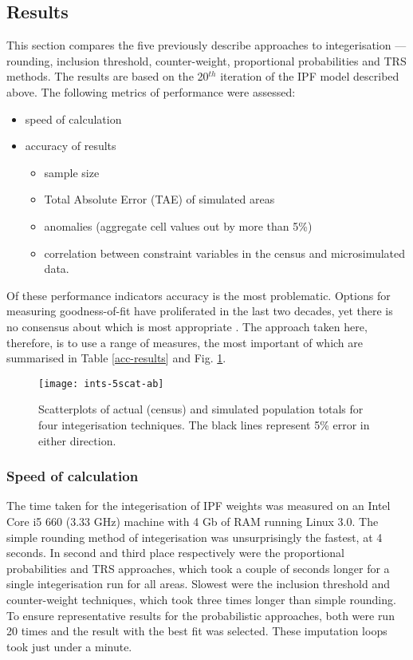 \subsection{Results}
\label{results}
This section compares the five previously describe approaches to
integerisation --- rounding, inclusion threshold, counter-weight, proportional
probabilities  and TRS methods. The results are based on the 20$^{th}$
iteration of the IPF model described above. The following metrics of
performance were assessed:
\begin{itemize}
 \item speed of calculation
\item accuracy of results
\begin{itemize}
 \item sample size
\item Total Absolute Error (TAE) of simulated areas
\item anomalies (aggregate cell values out by more than 5\%)
\item correlation between constraint variables in the census and
microsimulated data.
\end{itemize}
\end{itemize}

Of these performance indicators accuracy is the most problematic.
Options for measuring goodness-of-fit have proliferated in the last two decades,
yet there is no consensus about which is most appropriate \citep{Voas2001}.
The approach taken here, therefore, is to use a range of measures, the most
important of which are summarised in Table \ref{acc-results} and Fig.
\ref{fig:3scat}.

\begin{figure}[h*]
 \centerline{
 \texttt{[image: ints-5scat-ab]}}
 \caption[Scatterplots of actual (census) and simulated population
totals]{Scatterplots of actual (census) and simulated population totals for four
integerisation techniques. The black lines represent 5\% error in either
direction. }
 \label{fig:3scat}
\end{figure}

\subsubsection{Speed of calculation}
The time taken for the integerisation of IPF weights was measured on an Intel
Core i5 660 (3.33 GHz) machine with 4 Gb of RAM running Linux 3.0.
The simple rounding method of integerisation was unsurprisingly the fastest, at
4 seconds. %
In second and third place respectively were the proportional probabilities
and TRS approaches, which took a couple of seconds longer for a single
integerisation run for all areas.
Slowest were the inclusion threshold and counter-weight techniques, which took
three times longer than simple rounding. To ensure representative results for
the probabilistic approaches, both were run 20 times and the result with the
best fit was selected. These imputation loops took just under a minute.


